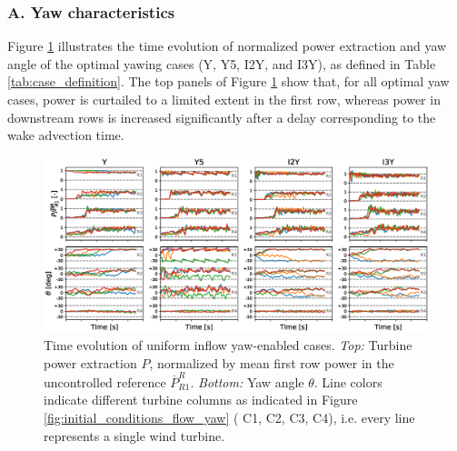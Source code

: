 	\subsubsection{A. Yaw characteristics}
	
	Figure \ref{fig:dynamic_uniform} illustrates the time evolution of normalized power extraction and yaw angle of the optimal yawing cases (Y, Y5, I2Y, and I3Y), as defined in Table \ref{tab:case_definition}. 
	The top panels of Figure \ref{fig:dynamic_uniform} show that, for all optimal yaw cases, power is curtailed to a limited extent in the first row, whereas power in downstream rows is increased significantly after a delay corresponding to the wake advection time.  
	\begin{figure}
		\includegraphics[width=\textwidth]{chapters/optimal_yaw_control/power_yaw_lam.eps}	
		\caption{Time evolution of uniform inflow yaw-enabled cases. \emph{Top: } Turbine power extraction $P$, normalized by mean first row power in the uncontrolled reference $\overline{P}_{R1}^R$. \emph{Bottom: } Yaw angle $\theta$. Line colors indicate different turbine columns as indicated in Figure \ref{fig:initial_conditions_flow_yaw} ({\color{C1} C1}, {\color{C2} C2}, {\color{C3} C3}, {\color{C4} C4}), i.e. every line represents a single wind turbine. \label{fig:dynamic_uniform}}
	\end{figure}
	
